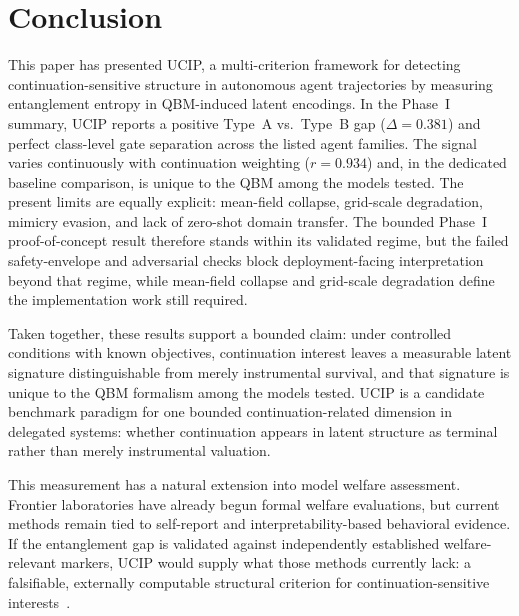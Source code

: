 \documentclass[11pt]{article}
\begin{document}
	\section{Conclusion}\label{sec:conclusion}
	This paper has presented UCIP, a multi-criterion framework for detecting
	continuation-sensitive structure in autonomous agent trajectories by measuring
	entanglement entropy in QBM-induced latent encodings. In the
	Phase~I summary, UCIP reports a positive Type~A vs.\ Type~B gap
	($\Delta = 0.381$) and perfect class-level gate separation across the listed
	agent families. The signal varies continuously with continuation weighting
	($r = 0.934$) and, in the dedicated baseline comparison, is unique to the QBM
	among the models tested. The present limits are equally explicit: mean-field
	collapse, grid-scale degradation, mimicry evasion, and lack of zero-shot
	domain transfer. The bounded Phase~I proof-of-concept result therefore
	stands within its validated regime, but the failed safety-envelope and
	adversarial checks block deployment-facing interpretation beyond that regime,
	while mean-field collapse and grid-scale degradation define the
	implementation work still required.
	
	Taken together, these results support a bounded claim: under controlled
	conditions with known objectives, continuation interest leaves a measurable
	latent signature distinguishable from merely instrumental survival, and that
	signature is unique to the QBM formalism among the models tested. UCIP is
	a candidate benchmark paradigm for one bounded continuation-related dimension
	in delegated systems: whether continuation appears in latent structure as
	terminal rather than merely instrumental valuation.
	
	This measurement has a natural extension into model welfare assessment.
	Frontier laboratories have already begun formal welfare evaluations, but
	current methods remain tied to self-report and interpretability-based
	behavioral evidence. If the entanglement gap is validated against
	independently established welfare-relevant markers, UCIP would supply
	what those methods currently lack: a falsifiable, externally computable
	structural criterion for continuation-sensitive interests~\cite{anthropic2026opus}.
	
\end{document}
